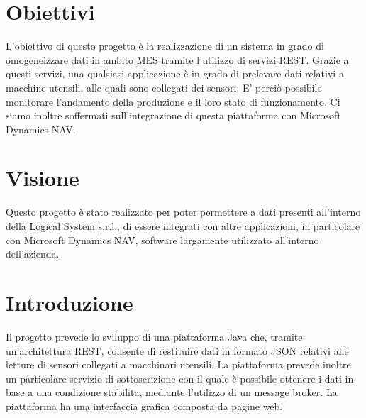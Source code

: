 \begin{titlepage}





 

\vfill %

\end{titlepage}
\section{Obiettivi}
L'obiettivo di questo progetto è la realizzazione di un sistema in grado di omogeneizzare dati in ambito MES tramite l'utilizzo di servizi REST. Grazie a questi servizi, una qualsiasi applicazione è in grado di prelevare dati relativi a macchine utensili, alle quali sono collegati dei sensori. E' perciò possibile monitorare l'andamento della produzione e il loro stato di funzionamento. Ci siamo inoltre soffermati sull'integrazione di questa piattaforma con Microsoft Dynamics NAV.
\section{Visione}
Questo progetto è stato realizzato per poter permettere a dati presenti all'interno della Logical System s.r.l., di essere integrati con altre applicazioni, in particolare con Microsoft Dynamics NAV, software largamente utilizzato all'interno dell'azienda.
\section{Introduzione}
Il progetto prevede lo sviluppo di una piattaforma Java che, tramite un'architettura REST, consente di restituire dati in formato JSON relativi alle letture di sensori collegati a macchinari utensili. La piattaforma prevede inoltre un particolare servizio di sottoscrizione con il quale è possibile ottenere i dati in base a una condizione stabilita, mediante l’utilizzo di un message broker. La piattaforma ha una interfaccia grafica composta da pagine web.
\clearpage
